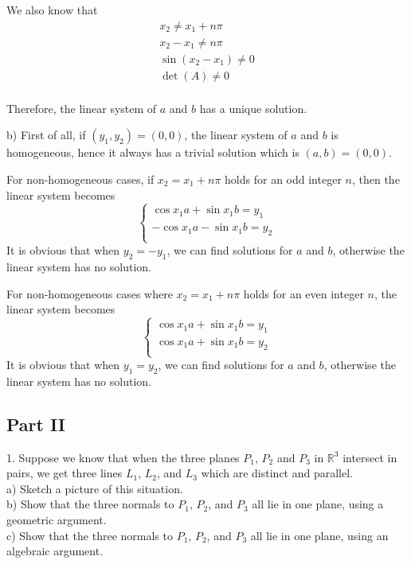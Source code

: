 \documentclass{article}
\begin{document}
We also know that
\begin{gather*}
  x_2 \neq x_1 + n\pi \\
  x_2 - x_1 \neq n\pi \\
  \sin (x_2 - x_1) \neq 0 \\
  \det(A) \neq 0 \\
\end{gather*}

Therefore, the linear system of $a$ and $b$ has a unique solution.

b)
First of all, if $(y_1, y_2) = (0, 0)$, the linear system of $a$ and $b$ is 
homogeneous, hence it always has a trivial solution which is $(a, b) = (0, 0)$.

For non-homogeneous cases, if $x_2 = x_1 + n\pi$ holds for an odd integer $n$, 
then the linear system becomes
\begin{equation*}
  \begin{cases}
    \cos x_1 a + \sin x_1 b = y_1 \\
    -\cos x_1 a - \sin x_1 b = y_2 \\
  \end{cases}
\end{equation*}
It is obvious that when $y_2 = -y_1$, we can find solutions for $a$ and $b$, 
otherwise the linear system has no solution.

For non-homogeneous cases where $x_2 = x_1 + n\pi$ holds for an even integer 
$n$, the linear system becomes
\begin{equation*}
  \begin{cases}
    \cos x_1 a + \sin x_1 b = y_1 \\
    \cos x_1 a + \sin x_1 b = y_2 \\
  \end{cases}
\end{equation*}
It is obvious that when $y_1 = y_2$, we can find solutions for $a$ and $b$, 
otherwise the linear system has no solution.

\begin{center}
\section*{Part II}
\end{center}

1. Suppose we know that when the three planes $P_1$, $P_2$ and $P_3$ in 
$\mathbb{R}^3$ intersect in pairs, we get three lines $L_1$, $L_2$, and $L_3$ 
which are distinct and parallel. \\
a) Sketch a picture of this situation. \\
b) Show that the three normals to $P_1$, $P_2$, and $P_3$ all lie in one plane, 
using a geometric argument. \\
c) Show that the three normals to $P_1$, $P_2$, and $P_3$ all lie in one plane,
using an algebraic argument.
\end{document}
